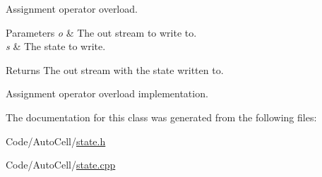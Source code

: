 Assignment operator overload.


\begin{DoxyParams}{Parameters}
{\em o} & The out stream to write to. \\
\hline
{\em s} & The state to write. \\
\hline
\end{DoxyParams}
\begin{DoxyReturn}{Returns}
The out stream with the state written to.
\end{DoxyReturn}
Assignment operator overload implementation. 

The documentation for this class was generated from the following files\+:\begin{DoxyCompactItemize}
\item 
Code/\+Auto\+Cell/\mbox{\hyperlink{state_8h}{state.\+h}}\item 
Code/\+Auto\+Cell/\mbox{\hyperlink{state_8cpp}{state.\+cpp}}\end{DoxyCompactItemize}
